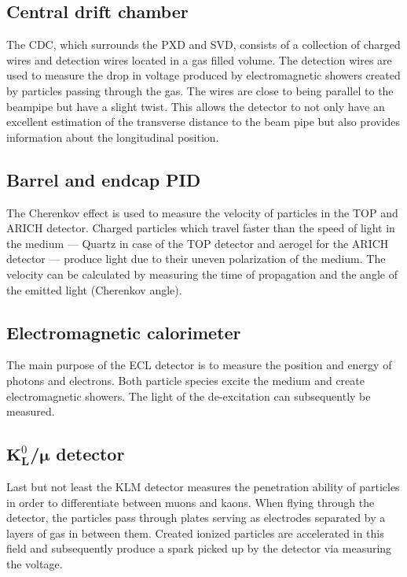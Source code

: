 \subsection{Central drift chamber}
\label{subsec:detector_system_tracking_detectors}

The CDC, which surrounds the PXD and SVD, consists of a collection of charged wires and detection wires located in a gas filled volume. The detection wires are used to measure the drop in voltage produced by electromagnetic showers created by particles passing through the gas. The wires are close to being parallel to the beampipe but have a slight twist. This allows the detector to not only have an excellent estimation of the transverse distance to the beam pipe but also provides information about the longitudinal position.

\subsection{Barrel and endcap PID}
\label{subsec:detector_system_barrel_and_endcap_pid}

The Cherenkov effect is used to measure the velocity of particles in the TOP and ARICH detector. Charged particles which travel faster than the speed of light in the medium --- Quartz in case of the TOP detector and aerogel for the ARICH detector --- produce light due to their uneven polarization of the medium. The velocity can be calculated by measuring the time of propagation and the angle of the emitted light (Cherenkov angle).

\subsection{Electromagnetic calorimeter}
\label{subsec:detector_system_electromagnetic_calorimeter}

The main purpose of the ECL detector is to measure the position and energy of photons and electrons. Both particle species excite the medium and create electromagnetic showers. The light of the de-excitation can subsequently be measured.

\subsection{$\boldsymbol{K}^0_{\boldsymbol{L}}$/$\boldsymbol{\mu}$ detector}
\label{subsec:detector_system_k0lmu}

Last but not least the KLM detector measures the penetration ability of particles in order to differentiate between muons and kaons. When flying through the detector, the particles pass through plates serving as electrodes separated by a layers of gas in between them. Created ionized particles are accelerated in this field and subsequently produce a spark picked up by the detector via measuring the voltage.

